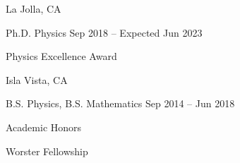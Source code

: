  \hfill La Jolla, CA

Ph.D. Physics \hfill Sep 2018 -- Expected Jun 2023

\begin{enumerate*}[label=\textbullet]
    \item Physics Excellence Award
\end{enumerate*}

 \hfill Isla Vista, CA

B.S. Physics, B.S. Mathematics \hfill Sep 2014 -- Jun 2018

\begin{enumerate*}[label=\textbullet]
    \item Academic Honors
    \item Worster Fellowship
\end{enumerate*}

%
%
